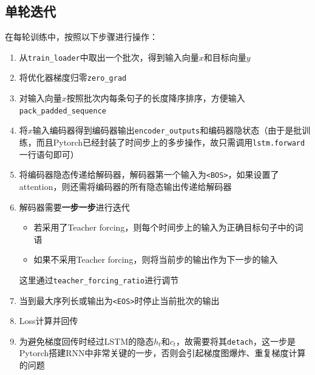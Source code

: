 \documentclass[logo,reportComp]{thesis}
\begin{document}
\subsection{单轮迭代}
在每轮训练中，按照以下步骤进行操作：
\begin{enumerate}
    \item 从\verb'train_loader'中取出一个批次，得到输入向量$x$和目标向量$y$
    \item 将优化器梯度归零\verb'zero_grad'
    \item 对输入向量$x$按照批次内每条句子的长度降序排序，方便输入\verb'pack_padded_sequence'
    \item 将$x$输入编码器得到编码器输出\verb'encoder_outputs'和编码器隐状态（由于是批训练，而且Pytorch已经封装了时间步上的多步操作，故只需调用\verb'lstm.forward'一行语句即可）
    \item 将编码器隐态传递给解码器，解码器第一个输入为\verb'<BOS>'，如果设置了attention，则还需将编码器的所有隐态输出传递给解码器
    \item 解码器需要\textbf{一步一步}进行迭代
    \begin{itemize}
        \item 若采用了Teacher forcing，则每个时间步上的输入为正确目标句子中的词语
        \item 如果不采用Teacher forcing，则将当前步的输出作为下一步的输入
    \end{itemize}
    这里通过\verb'teacher_forcing_ratio'进行调节
    \item 当到最大序列长或输出为\verb'<EOS>'时停止当前批次的输出
    \item Loss计算并回传
    \item 为避免梯度回传时经过LSTM的隐态$h_t$和$c_t$，故需要将其\verb'detach'，这一步是Pytorch搭建RNN中非常关键的一步，否则会引起梯度图爆炸、重复梯度计算的问题
\end{enumerate}
\end{document}
